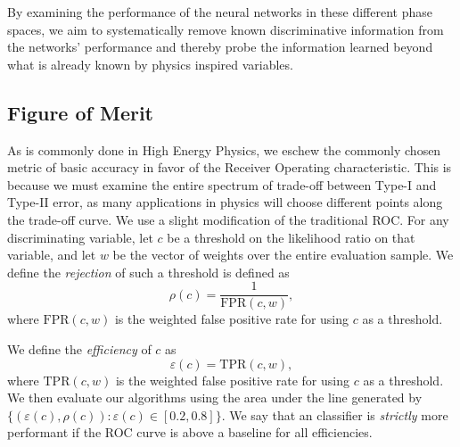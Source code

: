 By examining the performance of the neural networks in these different phase spaces, we aim to systematically remove known discriminative information from the networks' performance and thereby probe the information learned beyond what is already known by physics inspired variables.


\subsection{Figure of Merit} %
\label{sec:figure_of_merit}

As is commonly done in High Energy Physics, we eschew the commonly chosen metric of basic accuracy in favor of the Receiver Operating characteristic. This is because we must examine the entire spectrum of trade-off between Type-I and Type-II error, as many applications in physics will choose different points along the trade-off curve. We use a slight modification of the traditional ROC. For any discriminating variable, let $c$ be a threshold on the likelihood ratio on that variable, and let $w$ be the vector of weights over the entire evaluation sample. We define the \emph{rejection} of such a threshold is defined as 
$$
    \rho(c) = \frac{1}{\text{FPR}(c, w)},
$$
where $\text{FPR}(c, w)$ is the weighted false positive rate for using $c$ as a threshold.

We define the \emph{efficiency} of $c$ as 
$$
    \varepsilon(c) = \text{TPR}(c, w),
$$
where $\text{TPR}(c, w)$ is the weighted false positive rate for using $c$ as a threshold. We then evaluate our algorithms using the area under the line generated by $\{(\varepsilon(c), \rho(c)) : \varepsilon(c)\in [0.2, 0.8]\}$. We say that an classifier is \emph{strictly} more performant if the ROC curve is above a baseline for all efficiencies.